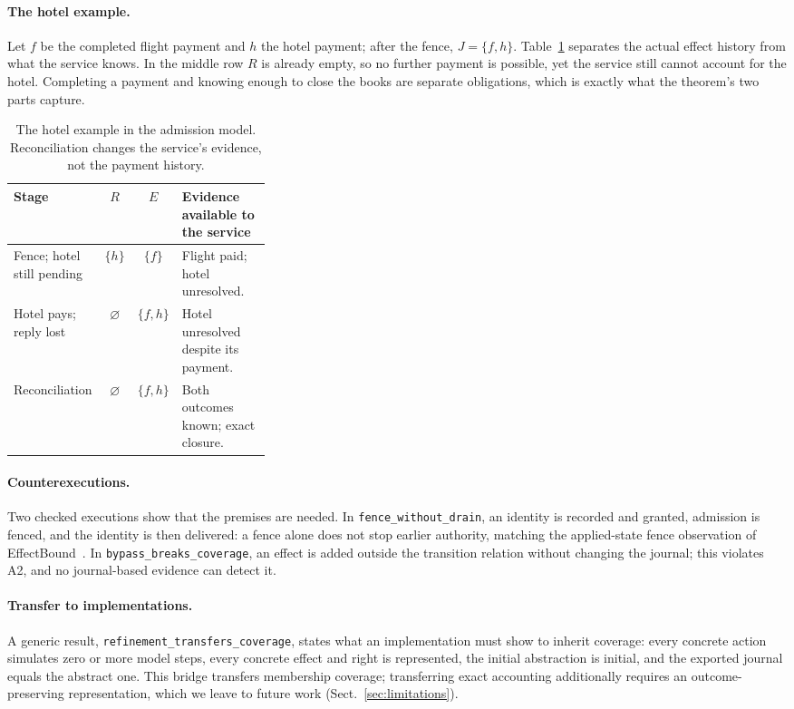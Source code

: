 \documentclass[runningheads]{llncs}
\newcommand{\code}[1]{\texttt{\small #1}}
\begin{document}
\paragraph{The hotel example.}
Let $f$ be the completed flight payment and $h$ the hotel payment; after the
fence, $J=\{f,h\}$. Table~\ref{tab:theorem_states} separates the actual effect
history from what the service knows. In the middle row $R$ is already empty, so
no further payment is possible, yet the service still cannot account for the
hotel. Completing a payment and knowing enough to close the books are separate
obligations, which is exactly what the theorem's two parts capture.

\begin{table}[t]
\centering\small
\caption{The hotel example in the admission model. Reconciliation changes the
service's evidence, not the payment history.}
\label{tab:theorem_states}
\begin{tabularx}{\linewidth}{@{}>{\raggedright\arraybackslash}p{0.33\linewidth} c c >{\raggedright\arraybackslash}X@{}}
\toprule
Stage & $R$ & $E$ & Evidence available to the service \\
\midrule
Fence; hotel still pending & $\{h\}$ & $\{f\}$ & Flight paid; hotel unresolved. \\
Hotel pays; reply lost & $\varnothing$ & $\{f,h\}$ & Hotel unresolved despite its payment. \\
Reconciliation & $\varnothing$ & $\{f,h\}$ & Both outcomes known; exact closure. \\
\bottomrule
\end{tabularx}
\end{table}

\paragraph{Counterexecutions.}
Two checked executions show that the premises are needed. In
\code{fence\_without\_drain}, an identity is recorded and granted, admission is
fenced, and the identity is then delivered: a fence alone does not stop
earlier authority, matching the applied-state fence observation of
EffectBound~\cite{effectbound}. In \code{bypass\_breaks\_coverage}, an effect is
added outside the transition relation without changing the journal; this
violates A2, and no journal-based evidence can detect it.

\paragraph{Transfer to implementations.}
A generic result, \code{refinement\_transfers\_coverage}, states what an
implementation must show to inherit coverage: every concrete action simulates
zero or more model steps, every concrete effect and right is represented, the
initial abstraction is initial, and the exported journal equals the abstract
one. This bridge transfers membership coverage; transferring exact accounting
additionally requires an outcome-preserving representation, which we leave to
future work (Sect.~\ref{sec:limitations}).
\end{document}
